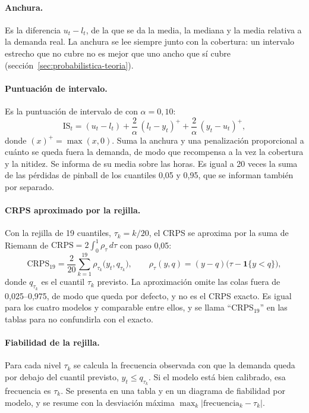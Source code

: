 \paragraph{Anchura.} Es la diferencia $u_t - l_t$, de la que se da la media, la
mediana y la media relativa a la demanda real. La anchura se lee siempre junto
con la cobertura: un intervalo estrecho que no cubre no es mejor que uno ancho
que sí cubre (sección~\ref{sec:probabilistica-teoria}).

\paragraph{Puntuación de intervalo.} Es la puntuación de intervalo de
\textcite{gneiting2007strictly} con $\alpha = 0{,}10$:
\[
\mathrm{IS}_t = (u_t - l_t) + \frac{2}{\alpha}\,(l_t - y_t)^{+} + \frac{2}{\alpha}\,(y_t - u_t)^{+},
\]
donde $(x)^{+} = \max(x, 0)$. Suma la anchura y una penalización proporcional a
cuánto se queda fuera la demanda, de modo que recompensa a la vez la
cobertura y la nitidez. Se informa de su media sobre las horas. Es igual a 20
veces la suma de las pérdidas de pinball de los cuantiles 0,05 y 0,95, que se
informan también por separado.

\paragraph{CRPS aproximado por la rejilla.} Con la rejilla de 19 cuantiles,
$\tau_k = k/20$, el CRPS se aproxima por la suma de Riemann de
$\mathrm{CRPS} = 2\int_0^1 \rho_\tau\,d\tau$ con paso 0,05:
\[
\mathrm{CRPS}_{19} = \frac{2}{20}\sum_{k=1}^{19} \rho_{\tau_k}\bigl(y_t, q_{\tau_k}\bigr),
\qquad
\rho_\tau(y, q) = (y - q)\bigl(\tau - \mathbf{1}\{y < q\}\bigr),
\]
donde $q_{\tau_k}$ es el cuantil $\tau_k$ previsto. La aproximación omite las
colas fuera de 0,025--0,975, de modo que queda por defecto, y no es el CRPS
exacto. Es igual para los cuatro modelos y comparable entre ellos, y se llama
\enquote{CRPS$_{19}$} en las tablas para no confundirla con el exacto.

\paragraph{Fiabilidad de la rejilla.} Para cada nivel $\tau_k$ se calcula la
frecuencia observada con que la demanda queda por debajo del cuantil previsto,
$y_t \le q_{\tau_k}$. Si el modelo está bien calibrado, esa frecuencia es $\tau_k$.
Se presenta en una tabla y en un diagrama de fiabilidad por modelo, y se
resume con la desviación máxima $\max_k |\text{frecuencia}_k - \tau_k|$.

